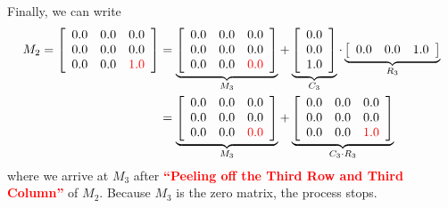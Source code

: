 Finally, we can write 
\begin{align*}
M_2=\left[
\begin{array}{ccc}
0.0 & 0.0 & 0.0 \\
0.0 &  0.0 &  0.0 \\
0.0 &  0.0 & \color{red} 1.0 \\
\end{array}
\right] & = \underbrace{
\left[
\begin{array}{ccc}
0.0 & 0.0 & 0.0 \\
0.0 & 0.0 & 0.0 \\
0.0 & 0.0 & \color{red} 0.0 \\
\end{array}
\right]
}_{M_3} + \underbrace{\left[
\begin{array}{c}
0.0 \\
0.0 \\
1.0 \\
\end{array}
\right]}_{C_3} \cdot \underbrace{\left[
\begin{array}{ccc}
0.0 & 0.0 & 1.0 \\
\end{array}
\right]}_{R_3} \\
& = \underbrace{
\left[
\begin{array}{ccc}
0.0 & 0.0 & 0.0 \\
0.0 &  0.0 &  0.0 \\
0.0 &  0.0 & \color{red} 0.0 \\
\end{array}
\right]
}_{M_3}  + \underbrace{
\left[
\begin{array}{ccc}
0.0 & 0.0 & 0.0 \\
0.0 & 0.0 & 0.0 \\
0.0 & 0.0 & \color{red} 1.0 \\
\end{array}
\right]
}_{C_3 \cdot R_3}
\end{align*}
where we arrive at $M_3$ after \textcolor{red}{\bf ``Peeling off the Third Row and Third Column''} of $M_2$. Because $M_3$ is the zero matrix, the process stops.\\

